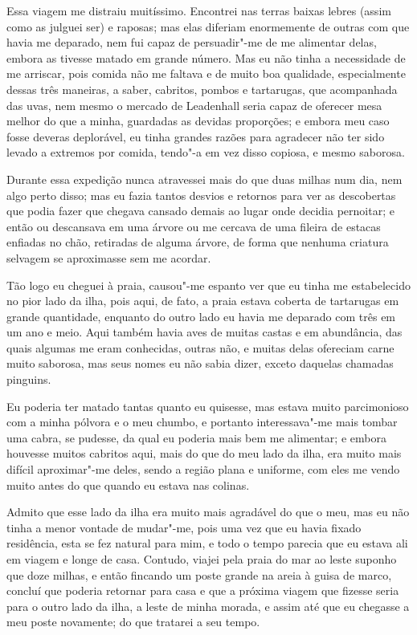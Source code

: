 Essa viagem me distraiu muitíssimo. Encontrei nas terras baixas lebres
(assim como as julguei ser) e raposas; mas elas diferiam enormemente de
outras com que havia me deparado, nem fui capaz de persuadir"-me de me
alimentar delas, embora as tivesse matado em grande número. Mas eu não
tinha a necessidade de me arriscar, pois comida não me faltava e de
muito boa qualidade, especialmente dessas três maneiras, a saber,
cabritos, pombos e tartarugas, que acompanhada das uvas, nem mesmo o
mercado de Leadenhall seria capaz de oferecer mesa melhor do que a
minha, guardadas as devidas proporções; e embora meu caso fosse deveras
deplorável, eu tinha grandes razões para agradecer não ter sido levado a
extremos por comida, tendo"-a em vez disso copiosa, e mesmo saborosa.

Durante essa expedição nunca atravessei mais do que duas milhas num dia,
nem algo perto disso; mas eu fazia tantos desvios e retornos para ver as
descobertas que podia fazer que chegava cansado demais ao lugar onde
decidia pernoitar; e então ou descansava em uma árvore ou me cercava de
uma fileira de estacas enfiadas no chão, retiradas de alguma árvore, de
forma que nenhuma criatura selvagem se aproximasse sem me acordar.

Tão logo eu cheguei à praia, causou"-me espanto ver que eu tinha me
estabelecido no pior lado da ilha, pois aqui, de fato, a praia estava
coberta de tartarugas em grande quantidade, enquanto do outro lado eu
havia me deparado com três em um ano e meio. Aqui também havia aves de
muitas castas e em abundância, das quais algumas me eram conhecidas,
outras não, e muitas delas ofereciam carne muito saborosa, mas seus
nomes eu não sabia dizer, exceto daquelas chamadas pinguins.

Eu poderia ter matado tantas quanto eu quisesse, mas estava muito
parcimonioso com a minha pólvora e o meu chumbo, e portanto
interessava"-me mais tombar uma cabra, se pudesse, da qual eu poderia
mais bem me alimentar; e embora houvesse muitos cabritos aqui, mais do
que do meu lado da ilha, era muito mais difícil aproximar"-me deles,
sendo a região plana e uniforme, com eles me vendo muito antes do que
quando eu estava nas colinas.

Admito que esse lado da ilha era muito mais agradável do que o meu, mas
eu não tinha a menor vontade de mudar"-me, pois uma vez que eu havia
fixado residência, esta se fez natural para mim, e todo o tempo parecia
que eu estava ali em viagem e longe de casa. Contudo, viajei pela praia
do mar ao leste suponho que doze milhas, e então fincando um poste
grande na areia à guisa de marco, concluí que poderia retornar para casa
e que a próxima viagem que fizesse seria para o outro lado da ilha, a
leste de minha morada, e assim até que eu chegasse a meu poste
novamente; do que tratarei a seu tempo.

